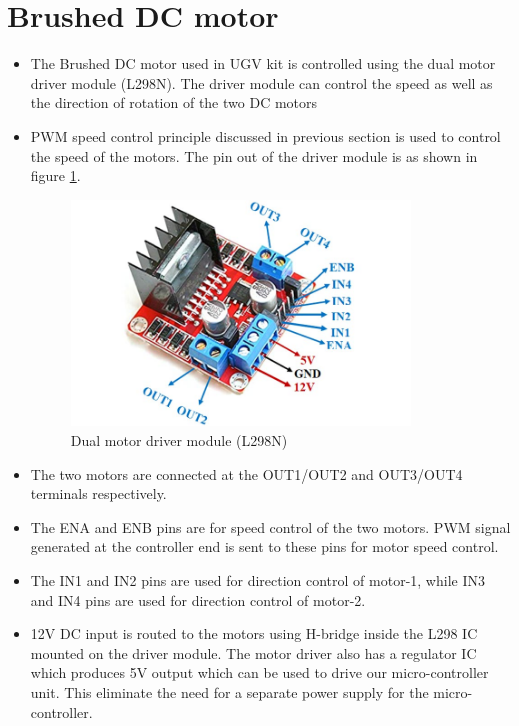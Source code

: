\section{Brushed DC motor}

\begin{itemize}
    \item The Brushed DC motor used in UGV kit is controlled using the dual motor driver module (L298N). The driver module can control the speed as well as the direction of rotation of the two DC motors
    \item PWM speed control principle discussed in previous section is used to control the speed of the motors. The pin out of the driver module is as shown in figure \ref{Motor_driver_L298}.
    
    \begin{figure}[h!]
    \centering
    \includegraphics[width=9cm]{./Figures/Motor_driver_L298.jpg}
    \caption{Dual motor driver module (L298N)}
    \label{Motor_driver_L298}
    \end{figure}
    
    \item The two motors are connected at the OUT1/OUT2 and OUT3/OUT4 terminals respectively.
    \item The ENA and ENB pins are for speed control of the two motors. PWM signal generated at the controller end is sent to these pins for motor speed control.
    \item The IN1 and IN2 pins are used for direction control of motor-1, while IN3 and IN4 pins are used for direction control of motor-2.
    \item 12V DC input is routed to the motors using H-bridge inside the L298 IC mounted on the driver module. The motor driver also has a regulator IC which produces 5V output which can be used to drive our micro-controller unit. This eliminate the need for a separate power supply for the micro-controller.
\end{itemize}

